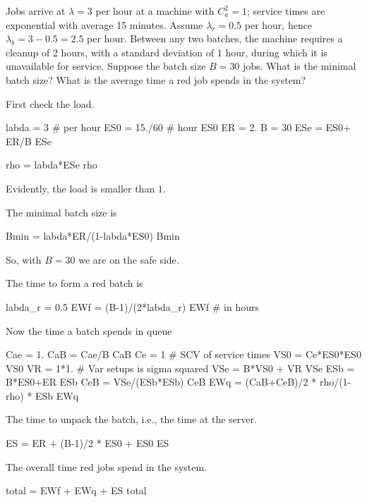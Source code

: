 \begin{exercise}[\faPhoto]
  Jobs arrive at $\lambda=3$ per hour at a machine with $C_a^2=1$; service times are exponential with average 15 minutes.  Assume $\lambda_r = 0.5$ per hour, hence $\lambda_b = 3-0.5=2.5$ per hour. Between any two batches, the machine requires a cleanup of 2 hours, with a standard deviation of $1$ hour, during which it is unavailable for service.  Suppose the batch size $B=30$ jobs. What is the minimal batch size?  What is the average time a red job spends in the system? 
  \begin{solution}
First check the load.
\begin{pyconsole}
labda = 3 # per hour
ES0 = 15./60 # hour
ES0
ER = 2.
B = 30
ESe = ES0+ ER/B
ESe

rho = labda*ESe
rho
\end{pyconsole}
Evidently, the load is smaller than $1$. 

The minimal batch size is
\begin{pyconsole}
Bmin = labda*ER/(1-labda*ES0)
Bmin
\end{pyconsole}
So, with $B=30$ we are on the safe side. 

The time to form a red batch is 
\begin{pyconsole}
labda_r = 0.5
EWf = (B-1)/(2*labda_r)
EWf # in hours
\end{pyconsole}

Now the time a batch spends in queue
\begin{pyconsole}
Cae = 1.
CaB = Cae/B
CaB
Ce = 1 # SCV of service times
VS0 = Ce*ES0*ES0
VS0
VR = 1*1. # Var setups is sigma squared
VSe = B*VS0 + VR
VSe
ESb = B*ES0+ER
ESb
CeB = VSe/(ESb*ESb)
CeB
EWq = (CaB+CeB)/2 * rho/(1-rho) * ESb
EWq
\end{pyconsole}

The time to unpack the batch, i.e., the time at the server. 
\begin{pyconsole}
ES = ER + (B-1)/2 * ES0 + ES0  
ES
\end{pyconsole}


The overall time red jobs spend in the system.
\begin{pyconsole}
total = EWf + EWq + ES
total
\end{pyconsole}

  \end{solution}
\end{exercise}

